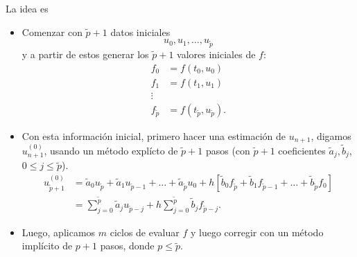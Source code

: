 \documentclass[11pt,letterpaper]{report}
\begin{document}
La idea es
\begin{itemize}
  \item
    Comenzar con $\tilde p + 1$ datos iniciales
    \begin{equation}
      u_0,u_1,\dots,u_{\tilde p}
    \end{equation}
    y a partir de estos generar los $\tilde p+1$ valores iniciales de
    $f$:
    \begin{align}
      f_0 &= f(t_0,u_0) \\
      f_1 &= f(t_1,u_1) \\
      \vdots \\
      f_{\tilde p} &= f(t_{\tilde p},u_{\tilde p})
    .\end{align}
  \item
    Con esta información inicial, primero hacer una estimación de
    $u_{n+1}$, digamos $u_{n+1}^{(0)}$, usando un método explícto de
    $\tilde p+1$ pasos (con $\tilde p+1$ coeficientes $\tilde a_j,
    \tilde b_j$, $0\leq j\leq \tilde p$).
    \begin{align}
      u_{\tilde p+1}^{(0)}
      &=
      \tilde a_{0} u_{\tilde p}
      + \tilde a_{1} u_{\tilde p - 1}
      + \dots +
      \tilde a_{\tilde p} u_{0}
      + h
        [
        \tilde b_0 f_{\tilde p}
        +
        \tilde b_1 f_{\tilde p-1}
        + \dots +
        \tilde b_{\tilde p} f_{0}
        ]
      \\
      &=
      \sum_{j=0}^{\tilde p}\tilde a_j u_{\tilde p-j}
      + h \sum_{j=0}^{\tilde p}\tilde b_j f_{\tilde p-j}
    .\end{align}
  \item
    Luego, aplicamos $m$ ciclos de evaluar $f$ y luego corregir con un
    método implícito de $p+1$ pasos, donde  $p\leq\tilde p$.

\end{itemize}
\end{document}
